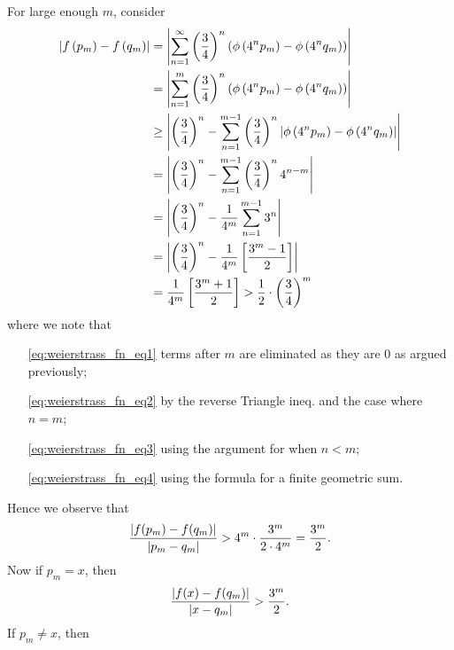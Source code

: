 \documentclass[notoc,notitlepage]{tufte-book}
\begin{document}
\begin{eg}
  For large enough $m$, consider
  \begin{align}
    \left| f\left( p_m \right) - f \left( q_m \right) \right|
      & = \left| \sum_{n=1}^{\infty} \left( \frac{3}{4} \right)^n \left( \phi \left( 4^n p_m \right) - \phi \left( 4^n q_m \right) \right) \right| \nonumber \\
      &= \left| \sum_{n=1}^{m} \left( \frac{3}{4} \right)^n \left( \phi \left( 4^n p_m \right) - \phi \left( 4^n q_m \right) \right) \right| \label{eq:weierstrass_fn_eq1} \\
      &\geq \left| \left( \frac{3}{4} \right)^n - \sum_{n=1}^{m - 1} \left( \frac{3}{4} \right)^n \left| \phi \left( 4^n p_m \right) - \phi \left( 4^n q_m \right) \right| \right| \label{eq:weierstrass_fn_eq2} \\
      &= \left| \left( \frac{3}{4} \right)^n - \sum_{n=1}^{m - 1} \left( \frac{3}{4} \right)^n 4^{n - m} \right| \label{eq:weierstrass_fn_eq3} \\
      &= \left| \left( \frac{3}{4} \right)^n - \frac{1}{4^m} \sum_{n=1}^{m - 1} 3^n \right| \nonumber \\
      &= \left| \left( \frac{3}{4} \right)^n - \frac{1}{4^m} \left[ \frac{3^m - 1}{2} \right] \right| \label{eq:weierstrass_fn_eq4} \\
      &= \frac{1}{4^m} \left[ \frac{3^m + 1}{2} \right] > \frac{1}{2} \cdot \left( \frac{3}{4} \right)^m \nonumber
  \end{align}
  where we note that
  \begin{itemize}
    \item[\eqref{eq:weierstrass_fn_eq1}] terms after $m$ are eliminated as they are $0$ as argued previously;
    \item[\eqref{eq:weierstrass_fn_eq2}] by the reverse Triangle ineq. and the case where $n = m$;
    \item[\eqref{eq:weierstrass_fn_eq3}] using the argument for when $n < m$;
    \item[\eqref{eq:weierstrass_fn_eq4}] using the formula for a finite geometric sum.
  \end{itemize}
  Hence we observe that
  \begin{equation*}
    \frac{\left| f(p_m) - f(q_m) \right|}{\left| p_m - q_m \right|} > 4^m \cdot \frac{3^m}{2 \cdot 4^m} = \frac{3^m}{2}.
  \end{equation*}
  Now if $p_m = x$, then
  \begin{equation*}
    \frac{\left| f(x) - f(q_m) \right|}{\left| x - q_m \right|} > \frac{3^m}{2}.
  \end{equation*}
  If $p_m \neq x$, then
  \begin{align*}

\end{align*}
\end{eg}
\end{document}
